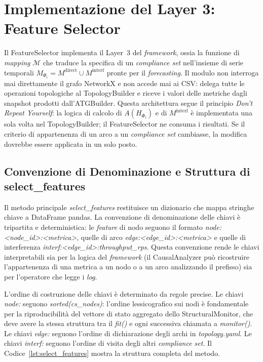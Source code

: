 \section{Implementazione del Layer 3: Feature Selector}
\label{sec:impl_feature_selector}

Il FeatureSelector implementa il Layer~3 del \textit{framework}, ossia la funzione di
\textit{mapping} $\mathcal{M}$ che traduce la specifica di un \textit{compliance set}
nell'insieme di serie temporali $M_{\Phi_i} = M^{\text{direct}} \cup M^{\text{interf}}$
pronte per il \textit{forecasting}. Il modulo non interroga mai direttamente il grafo NetworkX
e non accede mai ai CSV: delega tutte le operazioni topologiche al TopologyBuilder e riceve
i valori delle metriche dagli snapshot prodotti dall'ATGBuilder. Questa architettura segue il
principio \textit{Don't Repeat Yourself}: la logica di calcolo di $A(H_{\Phi_i})$ e di
$M^{\text{interf}}$ è implementata una sola volta nel TopologyBuilder; il FeatureSelector ne
consuma i risultati. Se il criterio di appartenenza di un arco a un \textit{compliance set}
cambiasse, la modifica dovrebbe essere applicata in un solo posto.

\subsection{Convenzione di Denominazione e Struttura di select\_features}
\label{subsec:feature_naming}

Il metodo principale \textit{select\_features} restituisce un dizionario che mappa stringhe
chiave a DataFrame pandas. La convenzione di denominazione delle chiavi è tripartita e
deterministica: le \textit{feature} di nodo seguono il formato
\textit{node:<node\_id>:<metrica>}, quelle di arco \textit{edge:<edge\_id>:<metrica>} e quelle
di interferenza \textit{interf:<edge\_id>:throughput\_rps}. Questa convenzione rende le chiavi
interpretabili sia per la logica del \textit{framework} (il CausalAnalyzer può ricostruire
l'appartenenza di una metrica a un nodo o a un arco analizzando il prefisso) sia per l'operatore
che legge i \textit{log}.

L'ordine di costruzione delle chiavi è determinato da regole precise. Le chiavi \textit{node:}
seguono \textit{sorted(cs\_nodes)}: l'ordine lessicografico sui nodi è fondamentale per la
riproducibilità del vettore di stato aggregato dello StructuralMonitor, che deve avere la stessa
struttura tra il \textit{fit()} e ogni successiva chiamata a \textit{monitor()}. Le chiavi
\textit{edge:} seguono l'ordine di dichiarazione degli archi in \textit{topology.yaml}. Le
chiavi \textit{interf:} seguono l'ordine di visita degli altri \textit{compliance set}.
Il Codice~\ref{lst:select_features} mostra la struttura completa del metodo.

